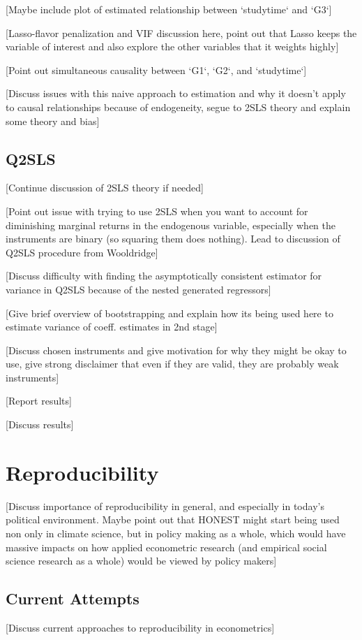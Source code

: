 \documentclass[12pt]{article}
\begin{document}
[Maybe include plot of estimated relationship between `studytime` and `G3`]

[Lasso-flavor penalization and VIF discussion here, point out that Lasso keeps the variable of interest and also explore the other variables that it weights highly]

[Point out simultaneous causality between `G1`, `G2`, and `studytime`]

[Discuss issues with this naive approach to estimation and why it doesn't apply to causal relationships because of endogeneity, segue to 2SLS theory and explain some theory and bias]

\subsection{Q2SLS}
[Continue discussion of 2SLS theory if needed]

[Point out issue with trying to use 2SLS when you want to account for diminishing marginal returns in the endogenous variable, especially when the instruments are binary (so squaring them does nothing). Lead to discussion of Q2SLS procedure from Wooldridge]

[Discuss difficulty with finding the asymptotically consistent estimator for variance in Q2SLS because of the nested generated regressors]

[Give brief overview of bootstrapping and explain how its being used here to estimate variance of coeff. estimates in 2nd stage]

[Discuss chosen instruments and give motivation for why they might be okay to use, give strong disclaimer that even if they are valid, they are probably weak instruments]

[Report results]

[Discuss results]


\newpage
\section{Reproducibility}
[Discuss importance of reproducibility in general, and especially in today's political environment. Maybe point out that HONEST might start being used non only in climate science, but in policy making as a whole, which would have massive impacts on how applied econometric research (and empirical social science research as a whole) would be viewed by policy makers]

\subsection{Current Attempts}
[Discuss current approaches to reproducibility in econometrics]
\end{document}
